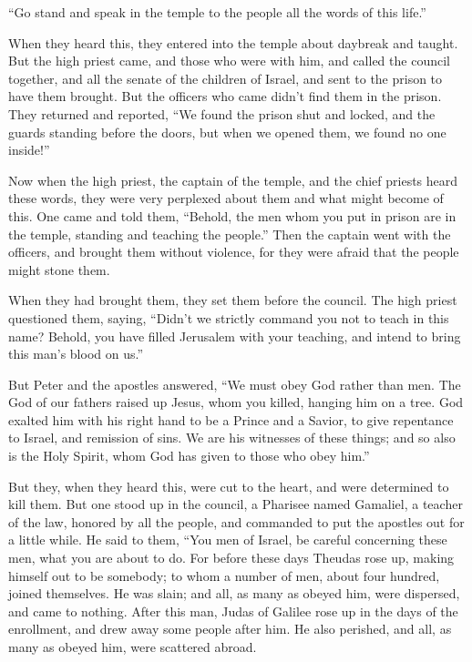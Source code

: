 {“Go stand and speak in the temple to the people all the words of this life.”
\par }{\PP {}When they heard this, they entered into the temple about daybreak and taught. But the high priest came, and those who were with him, and called the council together, and all the senate of the children of Israel, and sent to the prison to have them brought.
But the officers who came didn’t find them in the prison. They returned and reported,
“We found the prison shut and locked, and the guards standing before the doors, but when we opened them, we found no one inside!”
\par }{\PP {}Now when the high priest, the captain of the temple, and the chief priests heard these words, they were very perplexed about them and what might become of this.
One came and told them, “Behold, the men whom you put in prison are in the temple, standing and teaching the people.”
Then the captain went with the officers, and brought them without violence, for they were afraid that the people might stone them.
\par }{\PP {}When they had brought them, they set them before the council. The high priest questioned them,
saying, “Didn’t we strictly command you not to teach in this name? Behold, you have filled Jerusalem with your teaching, and intend to bring this man’s blood on us.”
\par }{\PP {}But Peter and the apostles answered, “We must obey God rather than men.
The God of our fathers raised up Jesus, whom you killed, hanging him on a tree.
God exalted him with his right hand to be a Prince and a Savior, to give repentance to Israel, and remission of sins.
We are his witnesses of these things; and so also is the Holy Spirit, whom God has given to those who obey him.”
\par }{\PP {}But they, when they heard this, were cut to the heart, and were determined to kill them.
But one stood up in the council, a Pharisee named Gamaliel, a teacher of the law, honored by all the people, and commanded to put the apostles out for a little while.
He said to them, “You men of Israel, be careful concerning these men, what you are about to do.
For before these days Theudas rose up, making himself out to be somebody; to whom a number of men, about four hundred, joined themselves. He was slain; and all, as many as obeyed him, were dispersed, and came to nothing.
After this man, Judas of Galilee rose up in the days of the enrollment, and drew away some people after him. He also perished, and all, as many as obeyed him, were scattered abroad.
}
